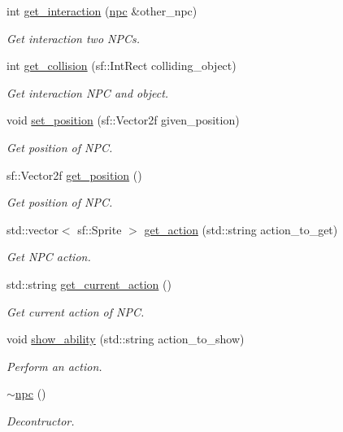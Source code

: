 \begin{DoxyCompactItemize}
int \hyperlink{classnpc_a2714b410c2e644040f69f1cf50d3bc50}{get\+\_\+interaction} (\hyperlink{classnpc}{npc} \&other\+\_\+npc)
\begin{DoxyCompactList}\small\item\em Get interaction two N\+PC\textquotesingle{}s. \end{DoxyCompactList}\item 
int \hyperlink{classnpc_a64342e70f2e8c3afde210ffa77e1e54e}{get\+\_\+collision} (sf\+::\+Int\+Rect colliding\+\_\+object)
\begin{DoxyCompactList}\small\item\em Get interaction N\+PC and object. \end{DoxyCompactList}\item 
void \hyperlink{classnpc_a52d22585e441af4d8dde1d1a2658b2dc}{set\+\_\+position} (sf\+::\+Vector2f given\+\_\+position)
\begin{DoxyCompactList}\small\item\em Get position of N\+PC. \end{DoxyCompactList}\item 
sf\+::\+Vector2f \hyperlink{classnpc_af58658444d25eaa77aec883dd9d5592d}{get\+\_\+position} ()
\begin{DoxyCompactList}\small\item\em Get position of N\+PC. \end{DoxyCompactList}\item 
std\+::vector$<$ sf\+::\+Sprite $>$ \hyperlink{classnpc_a78bc2f0af05b44a6a8e71fa3853c0920}{get\+\_\+action} (std\+::string action\+\_\+to\+\_\+get)
\begin{DoxyCompactList}\small\item\em Get N\+PC action. \end{DoxyCompactList}\item 
std\+::string \hyperlink{classnpc_a61315bb51941237b6b2c0fb578f3e5ee}{get\+\_\+current\+\_\+action} ()
\begin{DoxyCompactList}\small\item\em Get current action of N\+PC. \end{DoxyCompactList}\item 
void \hyperlink{classnpc_a2a5bbed340b918265dabc2dcfb5d07b6}{show\+\_\+ability} (std\+::string action\+\_\+to\+\_\+show)
\begin{DoxyCompactList}\small\item\em Perform an action. \end{DoxyCompactList}\item 
\hyperlink{classnpc_a77e7e3430ee5ff383f7a16b4b3e07fa1}{$\sim$npc} ()
\begin{DoxyCompactList}\small\item\em Decontructor. \end{DoxyCompactList}\end{DoxyCompactItemize}
